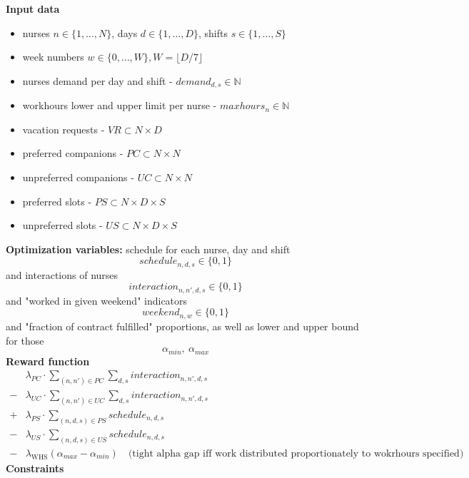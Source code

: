 \documentclass{article}
\newcommand{\N}{\mathbb{N}}
\begin{document}
\noindent \textbf{Input data}
\begin{itemize}
    \item nurses $n\in \{1, \dots, N\}$, days $d\in \{1, \dots, D\}$, shifts $s\in \{1, \dots, S\}$
    \item week numbers $w\in\{0, \dots, W\}, W=\lfloor D/7 \rfloor$
    \item nurses demand per day and shift - $demand_{d,s} \in \N$
    \item workhours lower and upper limit per nurse - $maxhours_n \in \N$
    \item vacation requests - $VR \subset N \times D$
    \item preferred companions - $PC \subset N \times N$
    \item unpreferred companions - $UC \subset N \times N$
    \item preferred slots - $PS \subset N \times D \times S$
    \item unpreferred slots - $US \subset N \times D \times S$
\end{itemize}
\textbf{Optimization variables:} schedule for each nurse, day and shift 
$$schedule_{n,d,s} \in \{0,1\}$$
and interactions of nurses \quad {}
$$interaction_{n,n',d,s} \in \{0,1\}$$
and "worked in given weekend" indicators
$$weekend_{n, w} \in \{0, 1\}$$
and "fraction of contract fulfilled" proportions, as well as lower and upper bound for those
$$\alpha_{min},\ \alpha_{max}$$
\textbf{Reward function}
\begin{align*}
     &\lambda_{PC}\cdot\sum_{(n, n')\in PC}\sum_{d,s} interaction_{n,n',d,s} \\
    -&\lambda_{UC}\cdot\sum_{(n, n')\in UC}\sum_{d,s} interaction_{n,n',d,s} \\ 
    +&\lambda_{PS}\cdot\sum_{(n, d, s)\in PS} schedule_{n,d,s} \\ 
    -&\lambda_{US}\cdot\sum_{(n, d, s)\in US} schedule_{n,d,s} \\
    -&\lambda_\text{WHS} (\alpha_{max} - \alpha_{min})\quad \text{(tight alpha gap iff work distributed proportionately to wokrhours specified)}
\end{align*}
\textbf{Constraints}
\end{document}
